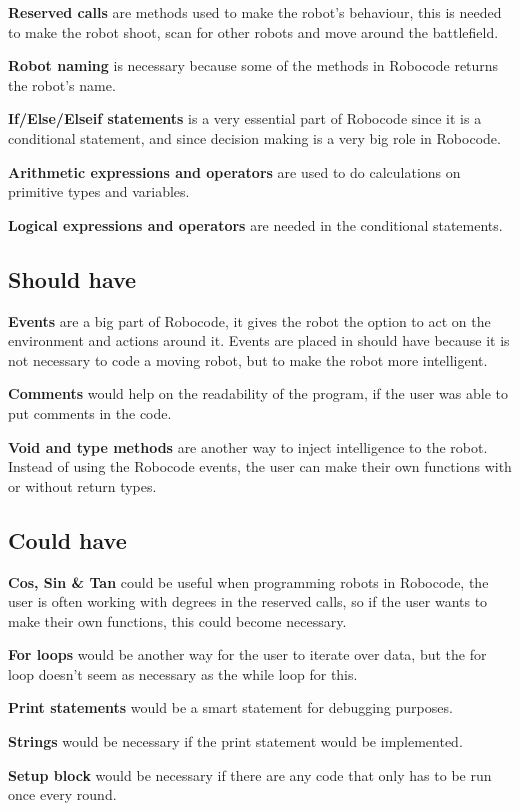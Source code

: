 \textbf{Reserved calls} are methods used to make the robot’s behaviour, this is needed to make the robot shoot, scan for other robots and move around the battlefield. 

\textbf{Robot naming} is necessary because some of the methods in Robocode returns the robot’s name. 

\textbf{If/Else/Elseif statements} is a very essential part of Robocode since it is a conditional statement, and since decision making is a very big role in Robocode.

\textbf{Arithmetic expressions and operators} are used to do calculations on primitive types and variables. 

\textbf{Logical expressions and operators} are needed in the conditional statements.

\subsection{Should have}
\textbf{Events} are a big part of Robocode, it gives the robot the option to act on the environment and actions around it. Events are placed in should have because it is not necessary to code a moving robot, but to make the robot more intelligent.

\textbf{Comments} would help on the readability of the program, if the user was able to put comments in the code. 

\textbf{Void and type methods} are another way to inject intelligence to the robot. Instead of using the Robocode events, the user can make their own functions with or without return types. 

\subsection{Could have} 
\textbf{Cos, Sin \& Tan} could be useful when programming robots in Robocode, the user is often working with degrees in the reserved calls, so if the user wants to make their own functions, this could become necessary.

\textbf{For loops} would be another way for the user to iterate over data, but the for loop doesn't seem as necessary as the while loop for this.

\textbf{Print statements} would be a smart statement for debugging purposes.

\textbf{Strings} would be necessary if the print statement would be implemented.

\textbf{Setup block} would be necessary if there are any code that only has to be run once every round. 

